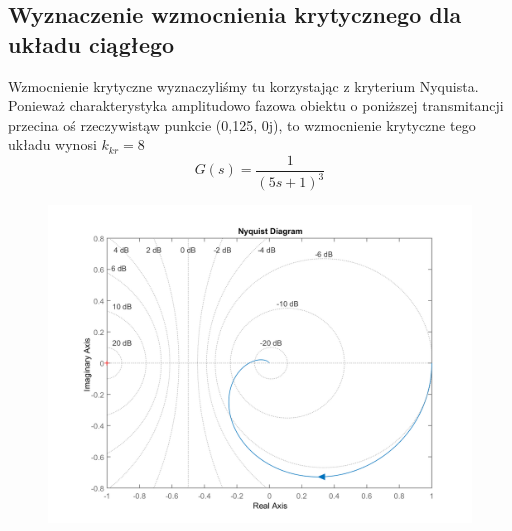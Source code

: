 \documentclass[a4paper, 12pt]{article}
\begin{document}
		\subsection{Wyznaczenie wzmocnienia krytycznego dla układu ciągłego}
			Wzmocnienie krytyczne wyznaczyliśmy tu korzystając z kryterium Nyquista. Ponieważ charakterystyka amplitudowo fazowa obiektu o poniższej transmitancji przecina oś rzeczywistą\linebreak w punkcie (0,125, 0j), to wzmocnienie krytyczne tego układu wynosi $k_{kr} = 8$
			$$
				G(s) = \frac{1}{(5s+1)^3}
			$$
			\begin{figure}[H]
				\centering
				\includegraphics[width = \textwidth]{./img/niquist_k_8.png}
			\end{figure}
\end{document}
